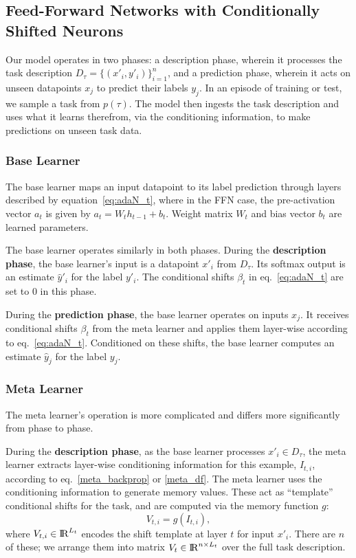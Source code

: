 \documentclass{article}
\begin{document}
\subsection{Feed-Forward Networks with Conditionally Shifted Neurons}

Our model operates in two phases: a description phase, wherein it processes the task description $D_{\tau} = \lbrace ( x'_i,y'_i ) \rbrace^n_{i=1}$, and a prediction phase, wherein it acts on unseen datapoints $x_j$ to predict their labels $y_j$.
In an episode of training or test, we sample a task from $p(\tau)$. The model then ingests the task description and uses what it learns therefrom, via the conditioning information, to make predictions on unseen task data.



\subsubsection{Base Learner}
The base learner maps an input datapoint to its label prediction through layers described by equation~\ref{eq:adaN_t}, where
in the FFN case, the pre-activation vector $a_t$ is given by $a_t = W_t h_{t-1} + b_t$. Weight matrix $W_t$ and bias vector $b_t$ are learned parameters.

The base learner operates similarly in both phases.
During the \textbf{description phase}, the base learner's input is a datapoint $x'_i$ from $D_\tau$.
Its softmax output is an estimate $\hat{y}'_i$ for the label $y'_i$.
The conditional shifts $\beta_t$ in eq.~\ref{eq:adaN_t} are set to $0$ in this phase.

During the \textbf{prediction phase}, the base learner operates on inputs $x_j$. It receives conditional shifts $\beta_t$ from the meta learner and applies them layer-wise according to eq.~\ref{eq:adaN_t}.
Conditioned on these shifts, the base learner computes an estimate $\hat{y}_j$ for the label $y_j$.


\subsubsection{Meta Learner}
The meta learner's operation is more complicated and differs more significantly from phase to phase.

During the \textbf{description phase}, as the base learner processes $x'_i \in D_\tau$, the meta learner extracts layer-wise conditioning information for this example, $I_{t,i}$, according to eq.~\ref{meta_backprop} or \ref{meta_df}.
The meta learner uses the conditioning information to generate memory values.
These act as ``template'' conditional shifts for the task,
and are computed via the memory function $g$:
\begin{equation}
V_{t,i} = g(I_{t,i}),
\label{eq:g}
\end{equation}
where $V_{t,i} \in {\rm I\!R}^{L_t}$ encodes the shift template at layer $t$ for input $x'_i$. There are $n$ of these; we arrange them into matrix $V_t \in {\rm I\!R}^{n \times L_t}$ over the full task description. 
\end{document}
